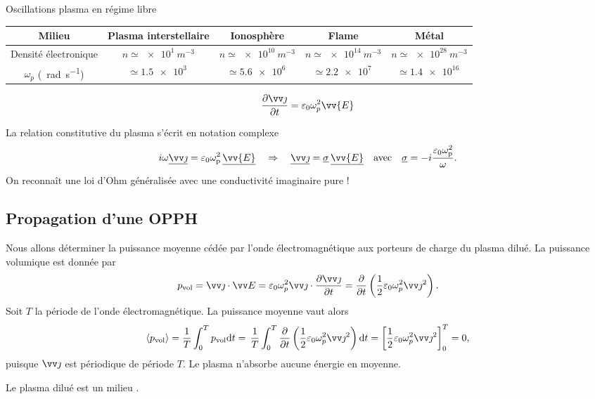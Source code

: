 \documentclass[12pt,fancy]{cours}
\begin{document}
\begin{exemple}{Oscillations plasma en régime libre}
{\begin{quest}
\begin{center}
   \begin{tabular}{|c|c|c|c|c|}
     \hline
     Milieu & Plasma interstellaire & Ionosphère & Flame & Métal \\
     \hline
     Densité électronique & $n\simeq\SI{e1}{m^{-3}}$ & $n\simeq\SI{e10}{m^{-3}}$ & $n\simeq\SI{e14}{m^{-3}}$ & $n\simeq\SI{e28}{m^{-3}}$ \\
     \hline
     $\omega_p$ (\SI{}{rad.s^{-1}}) & $\simeq\SI{1,5e3}{}$ & $\simeq\SI{5,6e6}{}$ & $\simeq\SI{2,2e7}{}$ & $\simeq\SI{1,4e16}{}$ \\
     \hline
   \end{tabular}
 \end{center}
\end{quest}
}
\end{exemple}

\begin{theorem}\label{formu:constit}
  $$
\dr{\j}{t}=\epz \omega_p^2 \vv{E}
  $$
\end{theorem}


\begin{remarque}
La relation constitutive du plasma s'écrit en notation complexe
\begin{equation}
i\omega\underline{\j}=\varepsilon_0\omega_{\rm{p}}^2\,\underline{\vv{E}}\quad\Rightarrow\quad\underline{\j}=\underline{\sigma}\,\underline{\vv{E}}\quad\text{avec}\quad\underline{\sigma}=-i\frac{\varepsilon_0\omega_{\rm{p}}^2}{\omega}.
\end{equation}
  On reconnaît une loi d'Ohm généralisée avec une conductivité imaginaire pure !
\end{remarque}

\subsection{Propagation d’une OPPH}

Nous allons déterminer la puissance moyenne cédée par l'onde électromagnétique aux porteurs de charge du plasma dilué. La puissance volumique est donnée par 
\begin{equation}
  p_{\rm vol} = \j \ps \E = \epz \omega_p^2 \j \cdot \dr{\j}{t} = \dr{}{t}\left( \frac{1}{2} \epz \omega_p^2 \j^2 \right).
\end{equation}
Soit $T$ la période de l'onde électromagnétique. La puissance moyenne vaut alors
\begin{equation}
\moy{p_{\rm vol}} =  \frac{1}{T} \int_0^T p_{\rm vol} \d t =\, \frac{1}{T} \int_0^T \dr{}{t}\left( \frac{1}{2} \epz \omega_p^2 \j^2 \right) \d t = \left[ \frac{1}{2} \epz \omega_p^2 \j^2  \right]_0^T = 0,
\end{equation}
puisque $\j$ est périodique de période $T$. Le plasma n'absorbe aucune énergie en moyenne.
\begin{prop}\label{prop:}
  Le plasma dilué est un milieu .
\end{prop}
\end{document}
